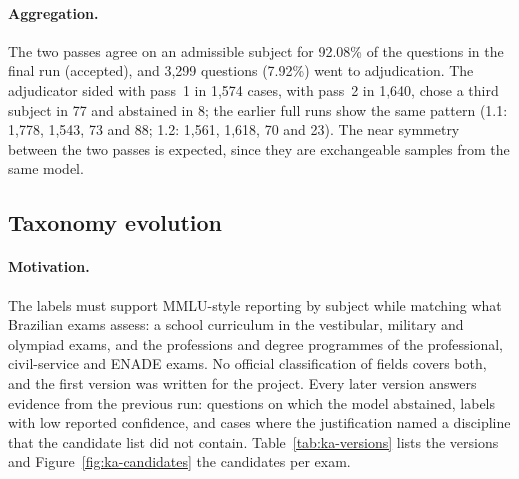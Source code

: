\paragraph{Aggregation.} The two passes agree on an admissible subject for
92.08\% of the questions in the final run (accepted), and 3,299 questions
(7.92\%) went to adjudication. The adjudicator sided with pass~1 in 1,574
cases, with pass~2 in 1,640, chose a third subject in 77 and abstained in 8;
the earlier full runs show the same pattern (1.1: 1,778, 1,543, 73 and 88;
1.2: 1,561, 1,618, 70 and 23). The near symmetry between the two passes is
expected, since they are exchangeable samples from the same model.

\subsection{Taxonomy evolution}
\label{app:ka-taxonomy}

\paragraph{Motivation.} The labels must support MMLU-style reporting by
subject while matching what Brazilian exams assess: a school curriculum in
the vestibular, military and olympiad exams, and the professions and degree
programmes of the professional, civil-service and ENADE exams. No official
classification of fields covers both, and the first version was written for
the project. Every later version answers evidence from the previous run:
questions on which the model abstained, labels with low reported confidence,
and cases where the justification named a discipline that the candidate list
did not contain. Table~\ref{tab:ka-versions} lists the versions and
Figure~\ref{fig:ka-candidates} the candidates per exam.

